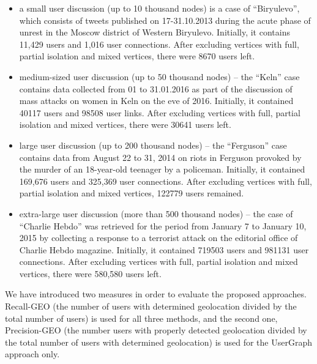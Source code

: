 \begin{itemize}
	\item a small user discussion (up to 10 thousand nodes) is a case of “Biryulevo”, which consists of tweets published on 17-31.10.2013 during the acute phase of unrest in the Moscow district of Western Biryulevo. Initially, it contains 11,429 users and 1,016 user connections. After excluding vertices with full, partial isolation and mixed vertices, there were 8670 users left.
	\item medium-sized user discussion (up to 50 thousand nodes) -- the “Keln” case contains data collected from 01 to 31.01.2016 as part of the discussion of mass attacks on women in Keln on the eve of 2016. Initially, it contained 40117 users and 98508 user links. After excluding vertices with full, partial isolation and mixed vertices, there were 30641 users left.
	\item large user discussion (up to 200 thousand nodes) -- the “Ferguson” case contains data from August 22 to 31, 2014 on riots in Ferguson provoked by the murder of an 18-year-old teenager by a policeman. Initially, it contained 169,676 users and 325,369 user connections. After excluding vertices with full, partial isolation and mixed vertices, 122779 users remained.
	\item extra-large user discussion (more than 500 thousand nodes) -- the case of “Charlie Hebdo” was retrieved for the period from January 7 to January 10, 2015 by collecting a response to a terrorist attack on the editorial office of Charlie Hebdo magazine. Initially, it contained 719503 users and 981131 user connections. After excluding vertices with full, partial isolation and mixed vertices, there were 580,580 users left.
\end{itemize}

We have introduced two measures in order to evaluate the proposed approaches. Recall-GEO (the number of users with determined geolocation divided by the total number of users) is used for all three methods, and the second one, Precision-GEO (the number users with properly detected geolocation divided by the total number of users with determined geolocation) is used for the UserGraph approach only.


